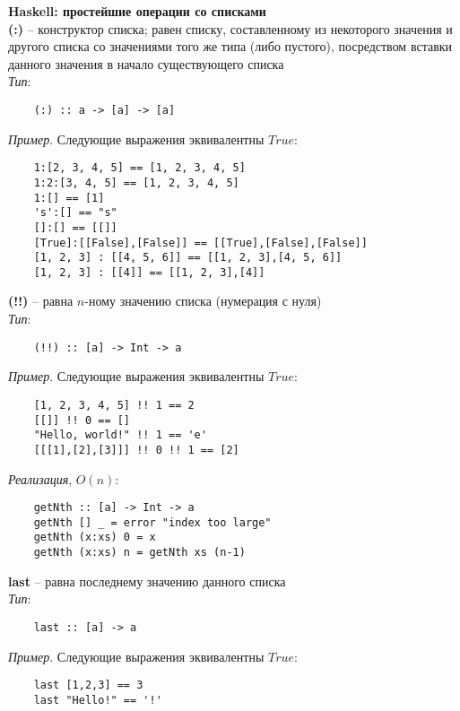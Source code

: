 \documentclass{article}
\begin{document}
	
	\textbf{Haskell: простейшие операции со списками}\\

	\textbf{(:)} -- конструктор списка; равен списку, составленному из некоторого значения и другого списка со значениями того же типа (либо пустого), посредством вставки данного значения в начало существующего списка\\

	\textit{Тип}:
	\begin{lstlisting}
	(:) :: a -> [a] -> [a]
	\end{lstlisting}

	\null\textit{Пример}. Следующие выражения эквивалентны $True$:
	\begin{lstlisting}
	1:[2, 3, 4, 5] == [1, 2, 3, 4, 5]
	1:2:[3, 4, 5] == [1, 2, 3, 4, 5]
	1:[] == [1]
	's':[] == "s"
	[]:[] == [[]]
	[True]:[[False],[False]] == [[True],[False],[False]]
	[1, 2, 3] : [[4, 5, 6]] == [[1, 2, 3],[4, 5, 6]]
	[1, 2, 3] : [[4]] == [[1, 2, 3],[4]]
	\end{lstlisting}

	\null\textbf{(!!)} -- равна $n$-ному значению списка (нумерация с нуля)\\

	\textit{Тип}:
	\begin{lstlisting}
	(!!) :: [a] -> Int -> a
	\end{lstlisting}

	\null\textit{Пример}. Следующие выражения эквивалентны $True$:
	\begin{lstlisting}
	[1, 2, 3, 4, 5] !! 1 == 2
	[[]] !! 0 == []
	"Hello, world!" !! 1 == 'e'
	[[[1],[2],[3]]] !! 0 !! 1 == [2]
	\end{lstlisting}

	\null\textit{Реализация}, $O(n)$:
	\begin{lstlisting}
	getNth :: [a] -> Int -> a
	getNth [] _ = error "index too large"
	getNth (x:xs) 0 = x
	getNth (x:xs) n = getNth xs (n-1)
	\end{lstlisting}

	\null\textbf{last} -- равна последнему значению данного списка\\

	\textit{Тип}:
	\begin{lstlisting}
	last :: [a] -> a
	\end{lstlisting}

	\null\textit{Пример}. Следующие выражения эквивалентны $True$:
	\begin{lstlisting}
	last [1,2,3] == 3
	last "Hello!" == '!'
	\end{lstlisting}
\end{document}
